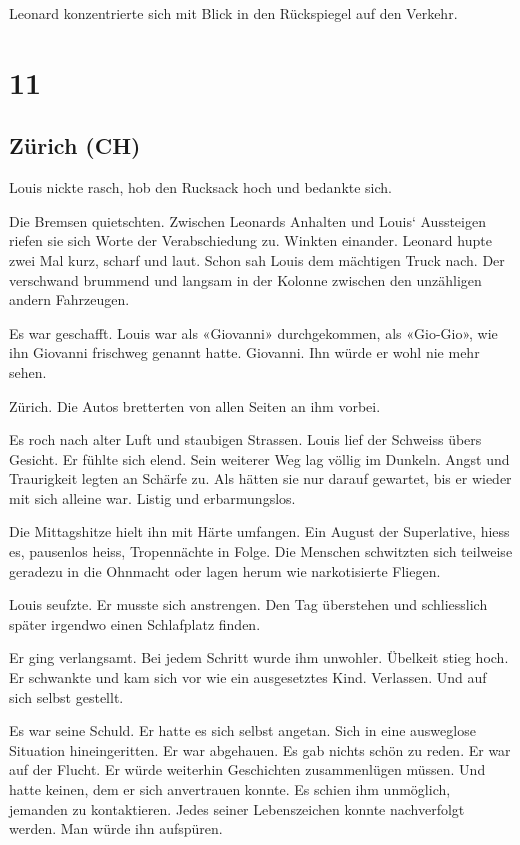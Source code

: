 Leonard konzentrierte sich mit Blick in den Rückspiegel auf den Verkehr.

\chapter{11}\label{section-10}

\section{Zürich (CH)}\label{zuxfcrich-ch}

Louis nickte rasch, hob den Rucksack hoch und bedankte sich.

Die Bremsen quietschten. Zwischen Leonards Anhalten und Louis`
Aussteigen riefen sie sich Worte der Verabschiedung zu. Winkten
einander. Leonard hupte zwei Mal kurz, scharf und laut. Schon sah Louis
dem mächtigen Truck nach. Der verschwand brummend und langsam in der
Kolonne zwischen den unzähligen andern Fahrzeugen.

Es war geschafft. Louis war als «Giovanni» durchgekommen, als «Gio-Gio»,
wie ihn Giovanni frischweg genannt hatte. Giovanni. Ihn würde er wohl
nie mehr sehen.

Zürich. Die Autos bretterten von allen Seiten an ihm vorbei.

Es roch nach alter Luft und staubigen Strassen. Louis lief der Schweiss
übers Gesicht. Er fühlte sich elend. Sein weiterer Weg lag völlig im
Dunkeln. Angst und Traurigkeit legten an Schärfe zu. Als hätten sie nur
darauf gewartet, bis er wieder mit sich alleine war. Listig und
erbarmungslos.

Die Mittagshitze hielt ihn mit Härte umfangen. Ein August der
Superlative, hiess es, pausenlos heiss, Tropennächte in Folge. Die
Menschen schwitzten sich teilweise geradezu in die Ohnmacht oder lagen
herum wie narkotisierte Fliegen.

Louis seufzte. Er musste sich anstrengen. Den Tag überstehen und
schliesslich später irgendwo einen Schlafplatz finden.

Er ging verlangsamt. Bei jedem Schritt wurde ihm unwohler. Übelkeit
stieg hoch. Er schwankte und kam sich vor wie ein ausgesetztes Kind.
Verlassen. Und auf sich selbst gestellt.

Es war seine Schuld. Er hatte es sich selbst angetan. Sich in eine
ausweglose Situation hineingeritten. Er war abgehauen. Es gab nichts
schön zu reden. Er war auf der Flucht. Er würde weiterhin Geschichten
zusammenlügen müssen. Und hatte keinen, dem er sich anvertrauen konnte.
Es schien ihm unmöglich, jemanden zu kontaktieren. Jedes seiner
Lebenszeichen konnte nachverfolgt werden. Man würde ihn aufspüren.

